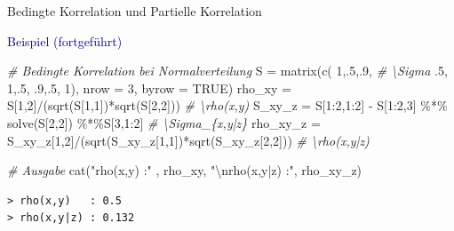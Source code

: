 \documentclass[
  8pt,
  ignorenonframetext,
]{beamer}
\newenvironment{Shaded}{\begin{snugshade}}{\end{snugshade}}
\newcommand{\AttributeTok}[1]{\textcolor[rgb]{0.77,0.63,0.00}{#1}}
\newcommand{\CommentTok}[1]{\textcolor[rgb]{0.56,0.35,0.01}{\textit{#1}}}
\newcommand{\ConstantTok}[1]{\textcolor[rgb]{0.00,0.00,0.00}{#1}}
\newcommand{\DecValTok}[1]{\textcolor[rgb]{0.00,0.00,0.81}{#1}}
\newcommand{\FunctionTok}[1]{\textcolor[rgb]{0.00,0.00,0.00}{#1}}
\newcommand{\NormalTok}[1]{#1}
\newcommand{\OtherTok}[1]{\textcolor[rgb]{0.56,0.35,0.01}{#1}}
\newcommand{\SpecialCharTok}[1]{\textcolor[rgb]{0.00,0.00,0.00}{#1}}
\newcommand{\StringTok}[1]{\textcolor[rgb]{0.31,0.60,0.02}{#1}}
\begin{document}
\begin{frame}[fragile]{Bedingte Korrelation und Partielle Korrelation}
\protect\hypertarget{bedingte-korrelation-und-partielle-korrelation-5}{}
\small
\vspace{1mm}

\textcolor{darkblue}{Beispiel (fortgeführt)} \footnotesize \vspace{2mm}

\begin{Shaded}
\begin{Highlighting}[]
\CommentTok{\# Bedingte Korrelation bei Normalverteilung }
\NormalTok{S         }\OtherTok{=} \FunctionTok{matrix}\NormalTok{(}\FunctionTok{c}\NormalTok{( }\DecValTok{1}\NormalTok{,.}\DecValTok{5}\NormalTok{,.}\DecValTok{9}\NormalTok{,                                   }\CommentTok{\# \textbackslash{}Sigma}
\NormalTok{                     .}\DecValTok{5}\NormalTok{, }\DecValTok{1}\NormalTok{,.}\DecValTok{5}\NormalTok{,}
\NormalTok{                     .}\DecValTok{9}\NormalTok{,.}\DecValTok{5}\NormalTok{, }\DecValTok{1}\NormalTok{), }\AttributeTok{nrow  =} \DecValTok{3}\NormalTok{, }\AttributeTok{byrow =} \ConstantTok{TRUE}\NormalTok{)}
\NormalTok{rho\_xy    }\OtherTok{=}\NormalTok{ S[}\DecValTok{1}\NormalTok{,}\DecValTok{2}\NormalTok{]}\SpecialCharTok{/}\NormalTok{(}\FunctionTok{sqrt}\NormalTok{(S[}\DecValTok{1}\NormalTok{,}\DecValTok{1}\NormalTok{])}\SpecialCharTok{*}\FunctionTok{sqrt}\NormalTok{(S[}\DecValTok{2}\NormalTok{,}\DecValTok{2}\NormalTok{]))                   }\CommentTok{\# \textbackslash{}rho(x,y)}
\NormalTok{S\_xy\_z    }\OtherTok{=}\NormalTok{ S[}\DecValTok{1}\SpecialCharTok{:}\DecValTok{2}\NormalTok{,}\DecValTok{1}\SpecialCharTok{:}\DecValTok{2}\NormalTok{] }\SpecialCharTok{{-}}\NormalTok{  S[}\DecValTok{1}\SpecialCharTok{:}\DecValTok{2}\NormalTok{,}\DecValTok{3}\NormalTok{] }\SpecialCharTok{\%*\%} \FunctionTok{solve}\NormalTok{(S[}\DecValTok{2}\NormalTok{,}\DecValTok{2}\NormalTok{]) }\SpecialCharTok{\%*\%}\NormalTok{S[}\DecValTok{3}\NormalTok{,}\DecValTok{1}\SpecialCharTok{:}\DecValTok{2}\NormalTok{] }\CommentTok{\# \textbackslash{}Sigma\_\{x,y|z\} }
\NormalTok{rho\_xy\_z  }\OtherTok{=}\NormalTok{ S\_xy\_z[}\DecValTok{1}\NormalTok{,}\DecValTok{2}\NormalTok{]}\SpecialCharTok{/}\NormalTok{(}\FunctionTok{sqrt}\NormalTok{(S\_xy\_z[}\DecValTok{1}\NormalTok{,}\DecValTok{1}\NormalTok{])}\SpecialCharTok{*}\FunctionTok{sqrt}\NormalTok{(S\_xy\_z[}\DecValTok{2}\NormalTok{,}\DecValTok{2}\NormalTok{]))    }\CommentTok{\# \textbackslash{}rho(x,y|z)}

\CommentTok{\# Ausgabe}
\FunctionTok{cat}\NormalTok{(}\StringTok{"rho(x,y)   :"}\NormalTok{  , rho\_xy,                           }
    \StringTok{"}\SpecialCharTok{\textbackslash{}n}\StringTok{rho(x,y|z) :"}\NormalTok{, rho\_xy\_z)                          }
\end{Highlighting}
\end{Shaded}

\begin{verbatim}
> rho(x,y)   : 0.5 
> rho(x,y|z) : 0.132
\end{verbatim}
\end{frame}
\end{document}
